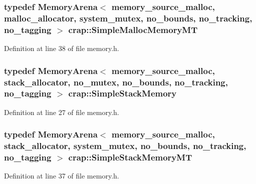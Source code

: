\hypertarget{namespacecrap_a86d2d770530309cb5cb92249b5efadcb}{}
\subsubsection[{Simple\+Malloc\+Memory\+M\+T}]{\setlength{\rightskip}{0pt plus 5cm}typedef {\bf Memory\+Arena}$<$ {\bf memory\+\_\+source\+\_\+malloc}, {\bf malloc\+\_\+allocator}, {\bf system\+\_\+mutex}, {\bf no\+\_\+bounds}, {\bf no\+\_\+tracking}, {\bf no\+\_\+tagging} $>$ {\bf crap\+::\+Simple\+Malloc\+Memory\+M\+T}}\label{namespacecrap_a86d2d770530309cb5cb92249b5efadcb}


Definition at line 38 of file memory.\+h.

\hypertarget{namespacecrap_a1265b2d1470f9e9196ec1ffcb2fd0701}{}
\subsubsection[{Simple\+Stack\+Memory}]{\setlength{\rightskip}{0pt plus 5cm}typedef {\bf Memory\+Arena}$<$ {\bf memory\+\_\+source\+\_\+malloc}, {\bf stack\+\_\+allocator}, {\bf no\+\_\+mutex}, {\bf no\+\_\+bounds}, {\bf no\+\_\+tracking}, {\bf no\+\_\+tagging} $>$ {\bf crap\+::\+Simple\+Stack\+Memory}}\label{namespacecrap_a1265b2d1470f9e9196ec1ffcb2fd0701}


Definition at line 27 of file memory.\+h.

\hypertarget{namespacecrap_aa7a4e4bf8df096c0ab06b0fdbf4c3c0f}{}
\subsubsection[{Simple\+Stack\+Memory\+M\+T}]{\setlength{\rightskip}{0pt plus 5cm}typedef {\bf Memory\+Arena}$<$ {\bf memory\+\_\+source\+\_\+malloc}, {\bf stack\+\_\+allocator}, {\bf system\+\_\+mutex}, {\bf no\+\_\+bounds}, {\bf no\+\_\+tracking}, {\bf no\+\_\+tagging} $>$ {\bf crap\+::\+Simple\+Stack\+Memory\+M\+T}}\label{namespacecrap_aa7a4e4bf8df096c0ab06b0fdbf4c3c0f}


Definition at line 37 of file memory.\+h.

